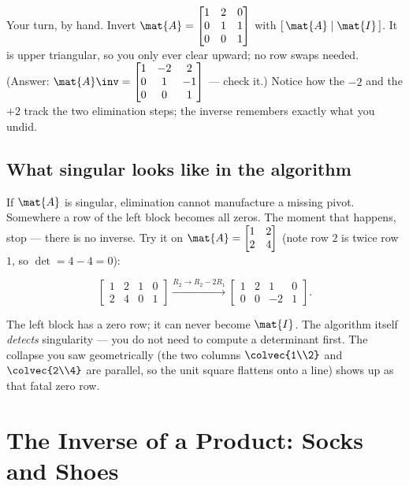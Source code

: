 \begin{labbox}
Your turn, by hand. Invert $\mat{A} = \begin{bmatrix} 1 & 2 & 0 \\ 0 & 1 & 1 \\ 0 & 0 & 1 \end{bmatrix}$ with $[\,\mat{A}\mid\mat{I}\,]$. It is upper triangular, so you only ever
clear upward; no row swaps needed. (Answer:
$\mat{A}\inv = \begin{bmatrix} 1 & -2 & 2 \\ 0 & 1 & -1 \\ 0 & 0 & 1 \end{bmatrix}$ ---
check it.) Notice how the $-2$ and the $+2$ track the two elimination steps; the inverse
remembers exactly what you undid.
\end{labbox}

\subsection{What singular looks like in the algorithm}

If $\mat{A}$ is singular, elimination cannot manufacture a missing pivot. Somewhere a
row of the left block becomes all zeros. The moment that happens, stop --- there is no
inverse. Try it on $\mat{A} = \begin{bmatrix} 1 & 2 \\ 2 & 4 \end{bmatrix}$ (note row
$2$ is twice row $1$, so $\det = 4 - 4 = 0$):

\[
\left[\begin{array}{cc|cc}
1 & 2 & 1 & 0 \\ 2 & 4 & 0 & 1
\end{array}\right]
\xrightarrow{R_2 \to R_2 - 2R_1}
\left[\begin{array}{cc|cc}
1 & 2 & 1 & 0 \\ 0 & 0 & -2 & 1
\end{array}\right].
\]

The left block has a zero row; it can never become $\mat{I}$. The algorithm itself
\emph{detects} singularity --- you do not need to compute a determinant first. The
collapse you saw geometrically (the two columns $\colvec{1\\2}$ and $\colvec{2\\4}$ are
parallel, so the unit square flattens onto a line) shows up as that fatal zero row.

\section{The Inverse of a Product: Socks and Shoes}
\label{ch08:product-inverse}

